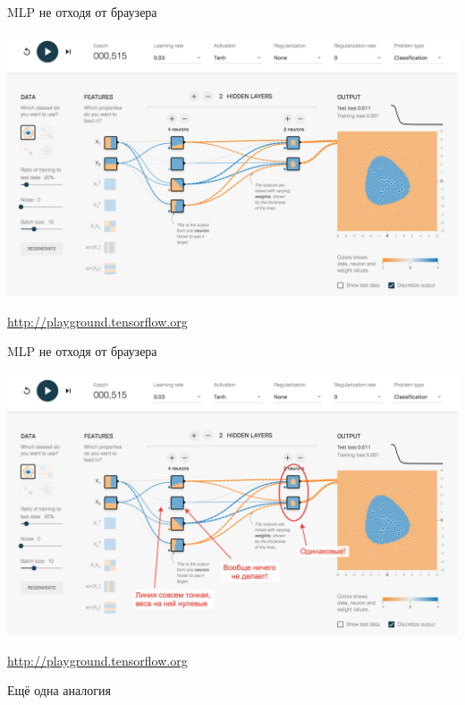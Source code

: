 \documentclass[notes,12pt, aspectratio=169]{beamer}
\begin{document}
\begin{frame}{MLP не отходя от браузера}
\begin{center}
	\includegraphics[width=0.76\paperwidth]{tensorflow_demo.png}
\end{center}
\vfill %
\footnotesize 
\color{blue} \url{http://playground.tensorflow.org}
\end{frame}


\begin{frame}{MLP не отходя от браузера}
\begin{center}
	\includegraphics[width=0.76\paperwidth]{tensorflow_demo2.png}
\end{center}
\vfill %
\footnotesize 
\color{blue} \url{http://playground.tensorflow.org}
\end{frame}


\begin{frame}{Ещё одна аналогия}
\begin{center}
\end{center}
\end{frame}
\end{document}
